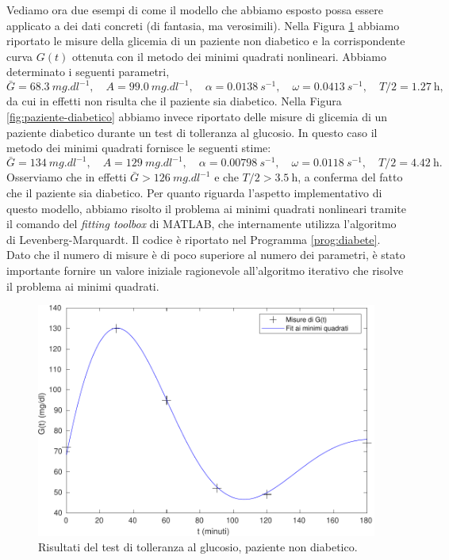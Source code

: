 Vediamo ora due esempi di come il modello che abbiamo esposto possa essere
applicato a dei dati concreti (di fantasia, ma verosimili).
Nella Figura \ref{fig:paziente-non-diabetico} abbiamo riportato le misure
della glicemia di un paziente non diabetico e la corrispondente curva $G(t)$
ottenuta con il metodo dei minimi quadrati nonlineari.
Abbiamo determinato i seguenti parametri,
\[
\bar{G} = \SI{68.3}{mg.dl^{-1}}, \quad
A = \SI{99.0}{mg.dl^{-1}}, \quad
\alpha = \SI{0.0138}{s^{-1}}, \quad
\omega = \SI{0.0413}{s^{-1}}, \quad
T/2 = \SI{1.27}{\hour},
\]
da cui in effetti non risulta che il paziente sia diabetico.
Nella Figura \ref{fig:paziente-diabetico} abbiamo invece riportato delle misure
di glicemia di un paziente diabetico durante un test di tolleranza al glucosio.
In questo caso il metodo dei minimi quadrati fornisce le seguenti stime:
\[
\bar{G} = \SI{134}{mg.dl^{-1}}, \quad
A = \SI{129}{mg.dl^{-1}}, \quad
\alpha = \SI{0.00798}{s^{-1}}, \quad
\omega = \SI{0.0118}{s^{-1}}, \quad
T/2 = \SI{4.42}{\hour}.
\]
Osserviamo che in effetti $\bar{G} > \SI{126}{mg.dl^{-1}}$ e che
$T/2 > \SI{3.5}{\hour}$, a conferma del fatto che il paziente sia diabetico.
Per quanto riguarda l'aspetto implementativo di questo modello,
abbiamo risolto il problema ai minimi quadrati nonlineari tramite il
comando  del \emph{fitting toolbox} di MATLAB,
che internamente utilizza l'algoritmo di Levenberg-Marquardt.
Il codice è riportato nel Programma \ref{prog:diabete}.
Dato che il numero di misure è di poco superiore al numero dei parametri,
è stato importante fornire un valore iniziale ragionevole all'algoritmo
iterativo che risolve il problema ai minimi quadrati.

\begin{figure}[p]
\centering
\includegraphics[height=0.27\textheight]{diabete1.pdf}
\caption{Risultati del test di tolleranza al glucosio, paziente non diabetico.}
\label{fig:paziente-non-diabetico}
\end{figure}

